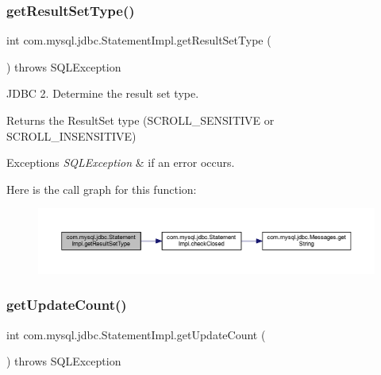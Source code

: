 \subsubsection{\texorpdfstring{get\+Result\+Set\+Type()}{getResultSetType()}}
{\footnotesize\ttfamily int com.\+mysql.\+jdbc.\+Statement\+Impl.\+get\+Result\+Set\+Type (\begin{DoxyParamCaption}{ }\end{DoxyParamCaption}) throws S\+Q\+L\+Exception}

J\+D\+BC 2. Determine the result set type.

\begin{DoxyReturn}{Returns}
the Result\+Set type (S\+C\+R\+O\+L\+L\+\_\+\+S\+E\+N\+S\+I\+T\+I\+VE or S\+C\+R\+O\+L\+L\+\_\+\+I\+N\+S\+E\+N\+S\+I\+T\+I\+VE)
\end{DoxyReturn}

\begin{DoxyExceptions}{Exceptions}
{\em S\+Q\+L\+Exception} & if an error occurs. \\
\hline
\end{DoxyExceptions}
Here is the call graph for this function\+:
\nopagebreak
\begin{figure}[H]
\begin{center}
\leavevmode
\includegraphics[width=350pt]{classcom_1_1mysql_1_1jdbc_1_1_statement_impl_ad7e587ec083198d9d53f53a131917d22_cgraph}
\end{center}
\end{figure}
\mbox{\label{classcom_1_1mysql_1_1jdbc_1_1_statement_impl_a5e320d2717fe1d637befef4f837719b6}} 
\subsubsection{\texorpdfstring{get\+Update\+Count()}{getUpdateCount()}}
{\footnotesize\ttfamily int com.\+mysql.\+jdbc.\+Statement\+Impl.\+get\+Update\+Count (\begin{DoxyParamCaption}{ }\end{DoxyParamCaption}) throws S\+Q\+L\+Exception}

